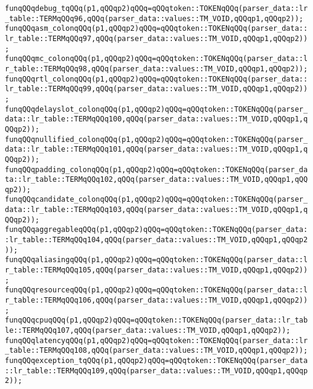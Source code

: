 \verb|funqQQqdebug_tqQQq(p1,qQQqp2)qQQq=qQQqtoken::TOKENqQQq(parser_data::lr_table::TERMqQQq96,qQQq(parser_data::values::TM_VOID,qQQqp1,qQQqp2));|\newline
\verb|funqQQqasm_colonqQQq(p1,qQQqp2)qQQq=qQQqtoken::TOKENqQQq(parser_data::lr_table::TERMqQQq97,qQQq(parser_data::values::TM_VOID,qQQqp1,qQQqp2));|\newline
\verb|funqQQqmc_colonqQQq(p1,qQQqp2)qQQq=qQQqtoken::TOKENqQQq(parser_data::lr_table::TERMqQQq98,qQQq(parser_data::values::TM_VOID,qQQqp1,qQQqp2));|\newline
\verb|funqQQqrtl_colonqQQq(p1,qQQqp2)qQQq=qQQqtoken::TOKENqQQq(parser_data::lr_table::TERMqQQq99,qQQq(parser_data::values::TM_VOID,qQQqp1,qQQqp2));|\newline
\verb|funqQQqdelayslot_colonqQQq(p1,qQQqp2)qQQq=qQQqtoken::TOKENqQQq(parser_data::lr_table::TERMqQQq100,qQQq(parser_data::values::TM_VOID,qQQqp1,qQQqp2));|\newline
\verb|funqQQqnullified_colonqQQq(p1,qQQqp2)qQQq=qQQqtoken::TOKENqQQq(parser_data::lr_table::TERMqQQq101,qQQq(parser_data::values::TM_VOID,qQQqp1,qQQqp2));|\newline
\verb|funqQQqpadding_colonqQQq(p1,qQQqp2)qQQq=qQQqtoken::TOKENqQQq(parser_data::lr_table::TERMqQQq102,qQQq(parser_data::values::TM_VOID,qQQqp1,qQQqp2));|\newline
\verb|funqQQqcandidate_colonqQQq(p1,qQQqp2)qQQq=qQQqtoken::TOKENqQQq(parser_data::lr_table::TERMqQQq103,qQQq(parser_data::values::TM_VOID,qQQqp1,qQQqp2));|\newline
\verb|funqQQqaggregableqQQq(p1,qQQqp2)qQQq=qQQqtoken::TOKENqQQq(parser_data::lr_table::TERMqQQq104,qQQq(parser_data::values::TM_VOID,qQQqp1,qQQqp2));|\newline
\verb|funqQQqaliasingqQQq(p1,qQQqp2)qQQq=qQQqtoken::TOKENqQQq(parser_data::lr_table::TERMqQQq105,qQQq(parser_data::values::TM_VOID,qQQqp1,qQQqp2));|\newline
\verb|funqQQqresourceqQQq(p1,qQQqp2)qQQq=qQQqtoken::TOKENqQQq(parser_data::lr_table::TERMqQQq106,qQQq(parser_data::values::TM_VOID,qQQqp1,qQQqp2));|\newline
\verb|funqQQqcpuqQQq(p1,qQQqp2)qQQq=qQQqtoken::TOKENqQQq(parser_data::lr_table::TERMqQQq107,qQQq(parser_data::values::TM_VOID,qQQqp1,qQQqp2));|\newline
\verb|funqQQqlatencyqQQq(p1,qQQqp2)qQQq=qQQqtoken::TOKENqQQq(parser_data::lr_table::TERMqQQq108,qQQq(parser_data::values::TM_VOID,qQQqp1,qQQqp2));|\newline
\verb|funqQQqexception_tqQQq(p1,qQQqp2)qQQq=qQQqtoken::TOKENqQQq(parser_data::lr_table::TERMqQQq109,qQQq(parser_data::values::TM_VOID,qQQqp1,qQQqp2));|\newline
